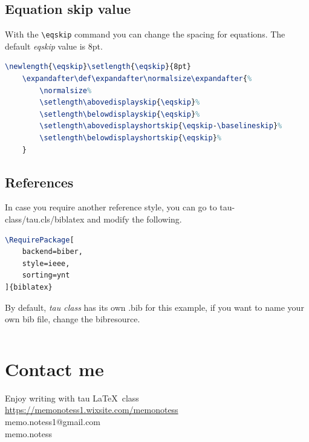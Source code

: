 \documentclass[9pt,a4paper,twoside]{tau-class/tau}
\begin{document}
    \subsection{Equation skip value}

        With the \verb|\eqskip| command you can change the spacing for equations. The default \textit{eqskip} value is 8pt.

\nolinenumbers
\begin{lstlisting}[language=TeX, caption=Equation skip code.]
	\newlength{\eqskip}\setlength{\eqskip}{8pt}
	\expandafter\def\expandafter\normalsize\expandafter{%
		\normalsize%
		\setlength\abovedisplayskip{\eqskip}%
		\setlength\belowdisplayskip{\eqskip}%
		\setlength\abovedisplayshortskip{\eqskip-\baselineskip}%
		\setlength\belowdisplayshortskip{\eqskip}%
	}
\end{lstlisting}
\linenumbers
		
    \subsection{References}
		
        In case you require another reference style, you can go to tau-class/tau.cls/biblatex and modify the following.
		
\nolinenumbers
\begin{lstlisting}[language=TeX, caption=References style.]
\RequirePackage[
	backend=biber,
	style=ieee,
	sorting=ynt
]{biblatex}
\end{lstlisting}
\linenumbers

        By default, \textit{tau class} has its own .bib for this example, if you want to name your own bib file, change the bibresource.
		
\nolinenumbers
\begin{lstlisting}[language=TeX]

\end{lstlisting}
\linenumbers

\section{Contact me}

    Enjoy writing with tau \LaTeX\ class\hspace{5pt}\faChessKnight \\ 
    \noindent\faWix\hspace{5pt}\href{https://memonotess1.wixsite.com/memonotess}{https://memonotess1.wixsite.com/memonotess} \\
    \faEnvelope[regular]\hspace{7pt}memo.notess1@gmail.com \\
    \faInstagram\hspace{8pt}memo.notess\\
\end{document}
